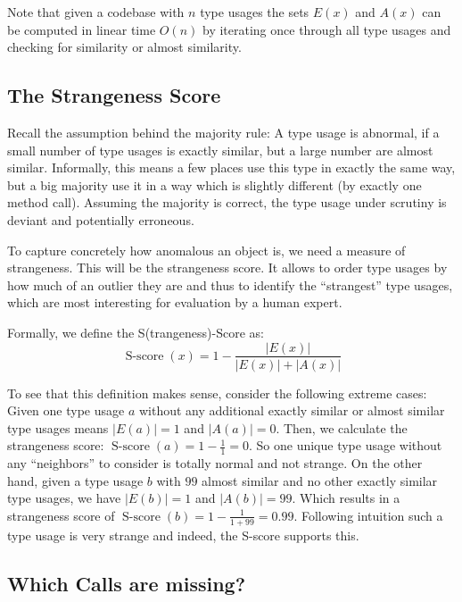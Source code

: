 Note that given a codebase with $n$ type usages the sets $E(x)$ and $A(x)$ can be computed in linear time $O(n)$ by iterating once through all type usages and checking for similarity or almost similarity.

\subsection{The Strangeness Score}

Recall the assumption behind the majority rule: A type usage is abnormal, if a small number of type usages is exactly similar, but a large number are almost similar.
Informally, this means a few places use this type in exactly the same way, but a big majority use it in a way which is slightly different (by exactly one method call).
Assuming the majority is correct, the type usage under scrutiny is deviant and potentially erroneous.

To capture concretely how anomalous an object is, we need a measure of strangeness.
This will be the strangeness score.
It allows to order type usages by how much of an outlier they are and thus to identify the ``strangest'' type usages, which are most interesting for evaluation by a human expert.

Formally, we define the S(trangeness)-Score as:
\begin{equation*}
    \operatorname{S-score}(x) = 1 - \frac{|E(x)|}{|E(x)|+|A(x)|}
\end{equation*}

To see that this definition makes sense, consider the following extreme cases:
Given one type usage $a$ without any additional exactly similar or almost similar type usages means $|E(a)| = 1$ and $|A(a)| = 0$.
Then, we calculate the strangeness score: $\operatorname{S-score}(a) = 1-\frac{1}{1} = 0$.
So one unique type usage without any ``neighbors'' to consider is totally normal and not strange.
On the other hand, given a type usage $b$ with $99$ almost similar and no other exactly similar type usages, we have $|E(b)| = 1$ and $|A(b)| = 99$.
Which results in a strangeness score of $\operatorname{S-score}(b) = 1-\frac{1}{1+99} = 0.99$.
Following intuition such a type usage is very strange and indeed, the S-score supports this.

\subsection{Which Calls are missing?}

